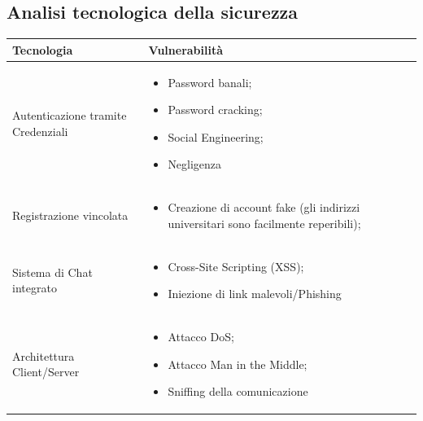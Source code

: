 \documentclass[12pt,a4paper]{report}
\begin{document}
\subsection{Analisi tecnologica della sicurezza}
\begin{tabularx}{\textwidth}{|p{5.5cm}|X|}
    \hline
    \rowcolor{studyColor} \textbf{Tecnologia} & \textbf{Vulnerabilità} \\ \hline
    \endhead
    Autenticazione tramite Credenziali & \begin{itemize}[nosep, leftmargin=*, before={\vspace{-0.5\baselineskip}}, after={\vspace{-0.8\baselineskip}}]
                    \item Password banali;
                    \item Password cracking;
                    \item Social Engineering;
                    \item Negligenza
                \end{itemize} \\ \hline
    Registrazione vincolata & \begin{itemize}[nosep, leftmargin=*, before={\vspace{-0.5\baselineskip}}, after={\vspace{-0.8\baselineskip}}]
                    \item Creazione di account fake (gli indirizzi universitari sono facilmente reperibili);
                \end{itemize} \\ \hline
    Sistema di Chat integrato & \begin{itemize}[nosep, leftmargin=*, before={\vspace{-0.5\baselineskip}}, after={\vspace{-0.8\baselineskip}}]
                    \item Cross-Site Scripting (XSS);
                    \item Iniezione di link malevoli/Phishing
                \end{itemize} \\ \hline
    Architettura Client/Server & \begin{itemize}[nosep, leftmargin=*, before={\vspace{-0.5\baselineskip}}, after={\vspace{-0.8\baselineskip}}]
                    \item Attacco DoS;
                    \item Attacco Man in the Middle;
                    \item Sniffing della comunicazione
                \end{itemize} \\ \hline


\end{tabularx}
\end{document}
